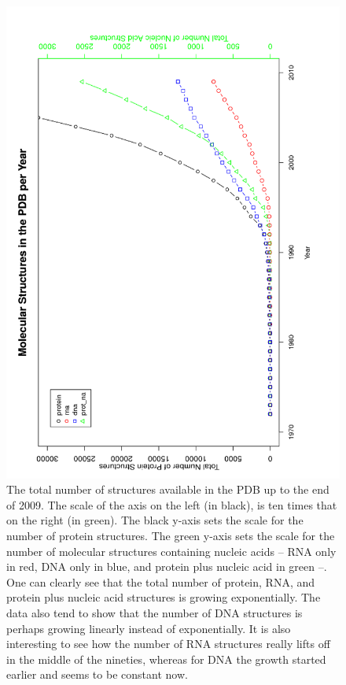 \begin{figure}
\centering
\includegraphics[angle=0, scale=0.3]{Chapter2/allmolecules_per_year.png}
\caption{The total number of structures available in the PDB up to the
  end of 2009.  The  scale of the axis on the left  (in black), is ten
  times that on the right (in  green). The black y-axis sets the scale
  for the  number of  protein structures.  The  green y-axis  sets the
  scale  for the  number  of molecular  structures containing  nucleic
  acids -- RNA only in red, DNA only in blue, and protein plus nucleic
  acid in  green --.   One can  clearly see that  the total  number of
  protein, RNA,  and protein plus  nucleic acid structures  is growing
  exponentially.  The  data also tend to  show that the  number of DNA
  structures is perhaps growing linearly instead of exponentially.  It
  is also interesting  to see how the number  of RNA structures really
  lifts off in the middle of  the nineties, whereas for DNA the growth
  started earlier and seems to be constant now.}
\label{fig:allpolypdb}
\end{figure}

